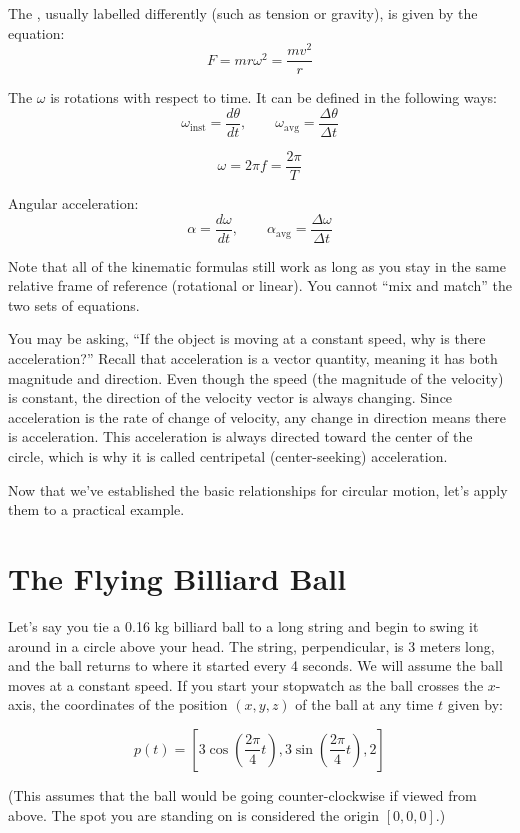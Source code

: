 The , usually labelled differently (such as tension or gravity), is given by the equation:
$$F = m r \omega^2 = \frac{m v^2}{r}$$


The  $\omega$ is rotations with respect to time. It can be defined in the following ways:
\[
  {\omega_{\text{inst}} = \frac{d\theta}{dt}},
  \qquad
  {\omega_{\text{avg}} = \frac{\Delta\theta}{\Delta t}}
\]

\[
  \omega = 2\pi f = \frac{2\pi}{T}
\]

Angular acceleration:
\[
  \alpha = \frac{d\omega}{dt}, \qquad
  \alpha_{\text{avg}} = \frac{\Delta\omega}{\Delta t}
\]

Note that all of the kinematic formulas still work as long as you stay in the same relative frame of reference (rotational or linear). You cannot ``mix and match'' the two sets of equations.

You may be asking, ``If the object is moving at a constant speed, why is there acceleration?'' Recall that acceleration is a vector quantity, meaning it has both magnitude and direction. Even though the speed (the magnitude of the velocity) is constant, the direction of the velocity vector is always changing. Since acceleration is the rate of change of velocity, any change in direction means there is acceleration. This acceleration is always directed toward the center of the circle, which is why it is called centripetal (center-seeking) acceleration.

Now that we've established the basic relationships for circular motion, let's apply them to a practical example.
\section{The Flying Billiard Ball}
Let's say you tie a 0.16 kg billiard ball to a long string and begin to swing it around in a circle above your head. The string, perpendicular, is 3 meters long, and the ball returns to where it started every 4 seconds. We will assume the ball moves at a constant speed. If you start your stopwatch as the ball crosses the $x$-axis, the coordinates of the position $(x,y,z)$ of the ball at any time $t$ given by:

$$p(t) = \left[3 \cos{\left( \frac{2 \pi} {4}t\right)}, 3 \sin{ \left( \frac{2 \pi}{4}t\right) }, 2\right]$$

(This assumes that the ball would be going counter-clockwise if viewed
from above. The spot you are standing on is considered the origin $[0, 0, 0]$.)


